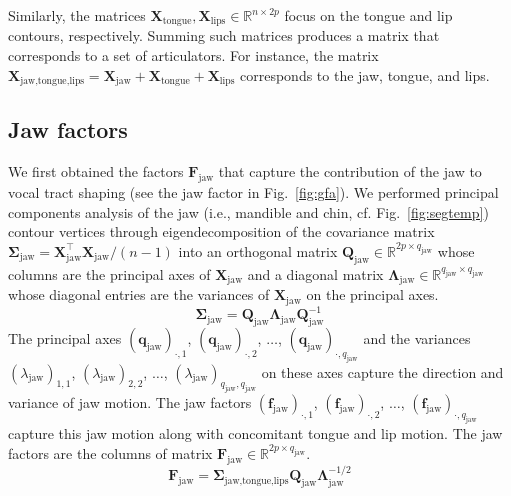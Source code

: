\documentclass[preprint]{JASAnew}\usepackage[]{graphicx}\usepackage[]{color}
\begin{document}
%
Similarly, the matrices $\mathbf{X}_\text{tongue},\mathbf{X}_\text{lips}\in \mathbb{R}^{n\times 2p}$ focus on the tongue and lip contours, respectively. 
% 
Summing such matrices produces a matrix that corresponds to a set of articulators. For instance, the matrix $\mathbf{X}_{\text{jaw,tongue,lips}} = \mathbf{X}_\text{jaw} + \mathbf{X}_\text{tongue} + \mathbf{X}_\text{lips}$ corresponds to the jaw, tongue, and lips.





\subsection{Jaw factors}
\label{subsec:jawfactors}

We first obtained the factors $\mathbf{F}_\text{jaw}$ that capture the contribution of the jaw to vocal tract shaping (see the jaw factor in Fig.~\ref{fig:gfa}). 
% 
We performed principal components analysis of the jaw (i.e., mandible and chin, cf. Fig.~\ref{fig:segtemp}) contour vertices through eigendecomposition of the covariance matrix $\boldsymbol{\Sigma}_\text{jaw} = \mathbf{X}_\text{jaw}^\intercal \mathbf{X}_\text{jaw}/(n-1)$ into an orthogonal matrix $\mathbf{Q}_\text{jaw} \in \mathbb{R}^{2p\times q_\text{jaw}}$ whose columns are the principal axes of $\mathbf{X}_\text{jaw}$ and a diagonal matrix $\boldsymbol{\Lambda}_\text{jaw} \in \mathbb{R}^{q_\text{jaw} \times q_\text{jaw}}$ whose diagonal entries are the variances of $\mathbf{X}_\text{jaw}$ on the principal axes.
% 
\begin{equation}
\boldsymbol{\Sigma}_\text{jaw} = \mathbf{Q}_\text{jaw}\boldsymbol{\Lambda}_\text{jaw} \mathbf{Q}_\text{jaw}^{-1}
\end{equation}
%
The principal axes $(\mathbf{q}_\text{jaw})_{\cdot,1}$, $(\mathbf{q}_\text{jaw})_{\cdot,2}$, $\ldots$, $(\mathbf{q}_\text{jaw})_{\cdot,q_\text{jaw}}$ and the variances $(\lambda_\text{jaw})_{1,1}$, $(\lambda_\text{jaw})_{2,2}$, $\ldots$, $(\lambda_\text{jaw})_{q_\text{jaw},q_\text{jaw}}$ on these axes capture the direction and variance of jaw motion. 
% 
The jaw factors $(\mathbf{f}_\text{jaw})_{\cdot,1}$, $(\mathbf{f}_\text{jaw})_{\cdot,2}$, $\ldots$, $(\mathbf{f}_\text{jaw})_{\cdot,q_\text{jaw}}$ capture this jaw motion along with concomitant tongue and lip motion.
% 
The jaw factors are the columns of matrix $\mathbf{F}_\text{jaw} \in \mathbb{R}^{2p\times q_\text{jaw}}$. 
%
\begin{equation}
\mathbf{F}_\text{jaw}
 = \boldsymbol{\Sigma}_\text{jaw,tongue,lips} \mathbf{Q}_\text{jaw} \boldsymbol{\Lambda}_\text{jaw}^{-1/2}
\end{equation}
\end{document}

